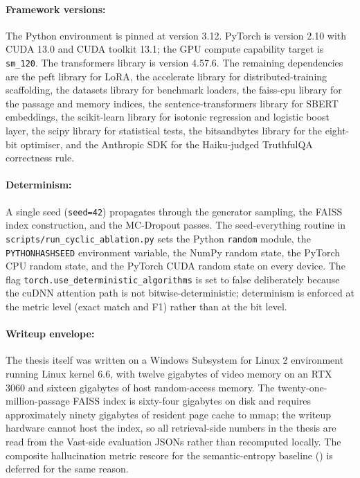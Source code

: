 \paragraph{Framework versions:} The Python environment is pinned at version 3.12. PyTorch is version 2.10 with CUDA 13.0 and CUDA toolkit 13.1; the GPU compute capability target is \verb|sm_120|. The transformers library is version 4.57.6. The remaining dependencies are the peft library for LoRA, the accelerate library for distributed-training scaffolding, the datasets library for benchmark loaders, the faiss-cpu library for the passage and memory indices, the sentence-transformers library for SBERT embeddings, the scikit-learn library for isotonic regression and logistic boost layer, the scipy library for statistical tests, the bitsandbytes library for the eight-bit optimiser, and the Anthropic SDK for the Haiku-judged TruthfulQA correctness rule.

\paragraph{Determinism:} A single seed (\verb|seed=42|) propagates through the generator sampling, the FAISS index construction, and the MC-Dropout passes. The seed-everything routine in \verb|scripts/run_cyclic_ablation.py| sets the Python \verb|random| module, the \verb|PYTHONHASHSEED| environment variable, the NumPy random state, the PyTorch CPU random state, and the PyTorch CUDA random state on every device. The flag \verb|torch.use_deterministic_algorithms| is set to false deliberately because the cuDNN attention path is not bitwise-deterministic; determinism is enforced at the metric level (exact match and F1) rather than at the bit level.

\paragraph{Writeup envelope:} The thesis itself was written on a Windows Subsystem for Linux 2 environment running Linux kernel 6.6, with twelve gigabytes of video memory on an RTX 3060 and sixteen gigabytes of host random-access memory. The twenty-one-million-passage FAISS index is sixty-four gigabytes on disk and requires approximately ninety gigabytes of resident page cache to mmap; the writeup hardware cannot host the index, so all retrieval-side numbers in the thesis are read from the Vast-side evaluation JSONs rather than recomputed locally. The composite hallucination metric rescore for the semantic-entropy baseline () is deferred for the same reason.

